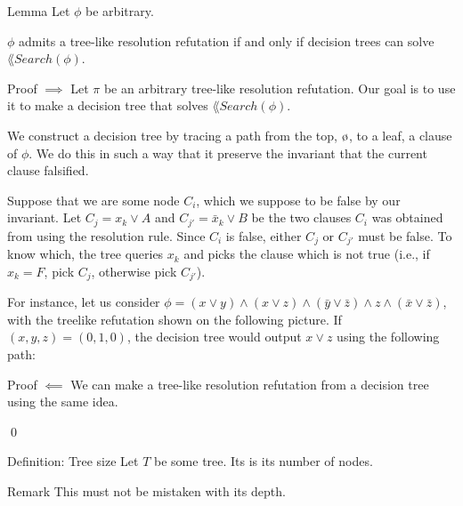 \documentclass[a4paper]{article}
\begin{document}
\begin{parag}{Lemma}
    Let $\phi$ be arbitrary.

    $\phi$ admits a tree-like resolution refutation if and only if decision trees can solve $\lang{Search}\left(\phi\right)$.

    \begin{subparag}{Proof $\implies$}
        Let $\pi$ be an arbitrary tree-like resolution refutation. Our goal is to use it to make a decision tree that solves $\lang{Search}\left(\phi\right)$.

        We construct a decision tree by tracing a path from the top, $\o$, to a leaf, a clause of $\phi$. We do this in such a way that it preserve the invariant that the current clause falsified.

        Suppose that we are some node $C_i$, which we suppose to be false by our invariant. Let $C_j = x_k \lor A$ and $C_{j'} = \bar{x}_k \lor B$ be the two clauses $C_i$ was obtained from using the resolution rule. Since $C_i$ is false, either $C_j$ or $C_{j'}$ must be false. To know which, the tree queries $x_k$ and picks the clause which is not true (i.e., if $x_k = F$, pick $C_j$, otherwise pick $C_{j'}$). 

        For instance, let us consider $\phi = \left(x \lor y\right) \land \left(x \lor z\right) \land \left(\bar{y} \lor \bar{z}\right) \land z \land\left(\bar{x} \lor \bar{z}\right)$, with the treelike refutation shown on the following picture. If $\left(x, y, z\right) = \left(0, 1, 0\right)$, the decision tree would output $x \lor z$ using the following path:
    \end{subparag}

    \begin{subparag}{Proof $\impliedby$}
        We can make a tree-like resolution refutation from a decision tree using the same idea.

        \qed
    \end{subparag}
\end{parag}

\begin{parag}{Definition: Tree size}
    Let $T$ be some tree. Its  is its number of nodes.

    \begin{subparag}{Remark}
        This must not be mistaken with its depth.
    \end{subparag}
\end{parag}
\end{document}
